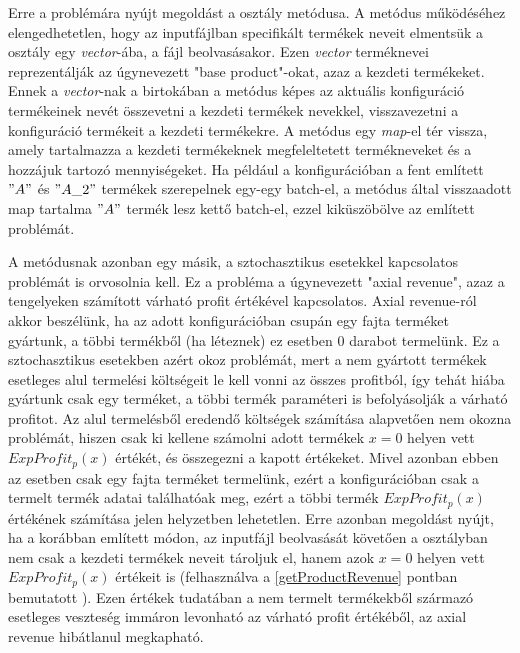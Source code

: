 Erre a problémára nyújt megoldást a  osztály  metódusa.
A metódus működéséhez elengedhetetlen, hogy az inputfájlban specifikált termékek neveit elmentsük a  osztály egy \textit{vector}-ába, a fájl beolvasásakor.
Ezen \textit{vector} terméknevei reprezentálják az úgynevezett "base product"-okat, azaz a kezdeti termékeket.
Ennek a \textit{vector}-nak a birtokában a  metódus képes az aktuális konfiguráció termékeinek nevét összevetni a kezdeti termékek nevekkel, visszavezetni a konfiguráció termékeit a kezdeti termékekre.
A metódus egy \textit{map}-el tér vissza, amely tartalmazza a kezdeti termékeknek megfeleltetett termékneveket és a hozzájuk tartozó mennyiségeket.
Ha például a konfigurációban a fent említett $"A"$ és $"A\_2"$ termékek szerepelnek egy-egy batch-el, a metódus által visszaadott map tartalma $"A"$ termék lesz kettő batch-el, ezzel kiküszöbölve az említett problémát.

A  metódusnak azonban egy másik, a sztochasztikus esetekkel kapcsolatos problémát is orvosolnia kell.
Ez a probléma a úgynevezett "axial revenue", azaz a tengelyeken számított várható profit értékével kapcsolatos.
Axial revenue-ról akkor beszélünk, ha az adott konfigurációban csupán egy fajta terméket gyártunk, a többi termékből (ha léteznek) ez esetben 0 darabot termelünk.
Ez a sztochasztikus esetekben azért okoz problémát, mert a nem gyártott termékek esetleges alul termelési költségeit le kell vonni az összes profitból, így tehát hiába gyártunk csak egy terméket, a többi termék paraméteri is befolyásolják a várható profitot.
Az alul termelésből eredendő költségek számítása alapvetően nem okozna problémát, hiszen csak ki kellene számolni adott termékek $x=0$ helyen vett $ExpProfit_p(x)$ értékét, és összegezni a kapott értékeket.
Mivel azonban ebben az esetben csak egy fajta terméket termelünk, ezért a konfigurációban csak a termelt termék adatai találhatóak meg, ezért a többi termék $ExpProfit_p(x)$ értékének számítása jelen helyzetben lehetetlen.
Erre azonban megoldást nyújt, ha a korábban említett módon, az inputfájl beolvasását követően a  osztályban nem csak a kezdeti termékek neveit tároljuk el, hanem azok $x=0$ helyen vett $ExpProfit_p(x)$ értékeit is (felhasználva a \ref{getProductRevenue} pontban bemutatott ).
Ezen értékek tudatában a nem termelt termékekből származó esetleges veszteség immáron levonható az várható profit értékéből, az axial revenue hibátlanul megkapható.


